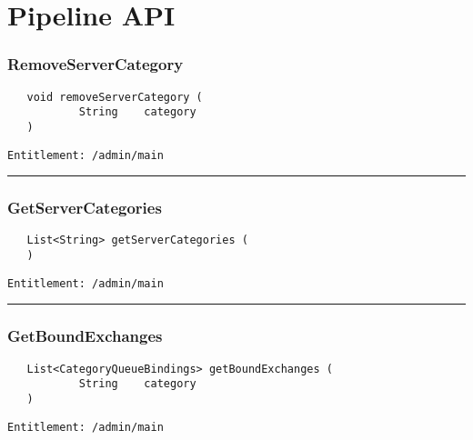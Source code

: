 \chapter{Pipeline API}

\subsection{RemoveServerCategory}
\label{Api:RemoveServerCategory}
\begin{Verbatim}
   void removeServerCategory (
           String    category
   )
\end{Verbatim}
\begin{Verbatim}[formatcom=\color{Maroon}]
  Entitlement: /admin/main
\end{Verbatim}



\rule{12cm}{2pt}
\subsection{GetServerCategories}
\label{Api:GetServerCategories}
\begin{Verbatim}
   List<String> getServerCategories (
   )
\end{Verbatim}
\begin{Verbatim}[formatcom=\color{Maroon}]
  Entitlement: /admin/main
\end{Verbatim}



\rule{12cm}{2pt}
\subsection{GetBoundExchanges}
\label{Api:GetBoundExchanges}
\begin{Verbatim}
   List<CategoryQueueBindings> getBoundExchanges (
           String    category
   )
\end{Verbatim}
\begin{Verbatim}[formatcom=\color{Maroon}]
  Entitlement: /admin/main
\end{Verbatim}



